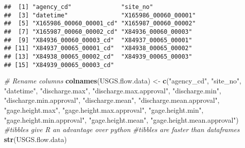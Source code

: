 \documentclass[]{article}
\newenvironment{Shaded}{\begin{snugshade}}{\end{snugshade}}
\newcommand{\KeywordTok}[1]{\textcolor[rgb]{0.13,0.29,0.53}{\textbf{#1}}}
\newcommand{\StringTok}[1]{\textcolor[rgb]{0.31,0.60,0.02}{#1}}
\newcommand{\CommentTok}[1]{\textcolor[rgb]{0.56,0.35,0.01}{\textit{#1}}}
\newcommand{\NormalTok}[1]{#1}
\begin{document}
\begin{verbatim}
##  [1] "agency_cd"              "site_no"               
##  [3] "datetime"               "X165986_00060_00001"   
##  [5] "X165986_00060_00001_cd" "X165987_00060_00002"   
##  [7] "X165987_00060_00002_cd" "X84936_00060_00003"    
##  [9] "X84936_00060_00003_cd"  "X84937_00065_00001"    
## [11] "X84937_00065_00001_cd"  "X84938_00065_00002"    
## [13] "X84938_00065_00002_cd"  "X84939_00065_00003"    
## [15] "X84939_00065_00003_cd"
\end{verbatim}

\begin{Shaded}
\begin{Highlighting}[]
\CommentTok{# Rename columns}
\KeywordTok{colnames}\NormalTok{(USGS.flow.data) <-}\StringTok{ }\KeywordTok{c}\NormalTok{(}\StringTok{"agency_cd"}\NormalTok{, }\StringTok{"site_no"}\NormalTok{, }\StringTok{"datetime"}\NormalTok{, }
                              \StringTok{"discharge.max"}\NormalTok{, }\StringTok{"discharge.max.approval"}\NormalTok{, }
                              \StringTok{"discharge.min"}\NormalTok{, }\StringTok{"discharge.min.approval"}\NormalTok{, }
                              \StringTok{"discharge.mean"}\NormalTok{, }\StringTok{"discharge.mean.approval"}\NormalTok{, }
                              \StringTok{"gage.height.max"}\NormalTok{, }\StringTok{"gage.height.max.approval"}\NormalTok{, }
                              \StringTok{"gage.height.min"}\NormalTok{, }\StringTok{"gage.height.min.approval"}\NormalTok{, }
                              \StringTok{"gage.height.mean"}\NormalTok{, }\StringTok{"gage.height.mean.approval"}\NormalTok{)}
\CommentTok{#tibbles give R an advantage over python}
\CommentTok{#tibbles are faster than dataframes}
\KeywordTok{str}\NormalTok{(USGS.flow.data)}
\end{Highlighting}
\end{Shaded}
\end{document}
